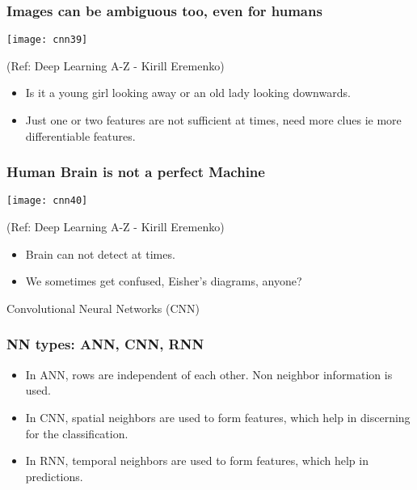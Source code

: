 \begin{frame}[fragile] \frametitle{Images can be ambiguous too, even for humans}

\begin{center}
\texttt{[image: cnn39]}

\tiny{(Ref: Deep Learning A-Z - Kirill Eremenko)}
\end{center}

\begin{itemize}
\item Is it a young girl looking away or an old lady looking downwards.
\item Just one or two features are not sufficient at times, need more clues ie more differentiable features.
\end{itemize}

\end{frame}

\begin{frame}[fragile] \frametitle{Human Brain is not a perfect Machine}

\begin{center}
\texttt{[image: cnn40]}

\tiny{(Ref: Deep Learning A-Z - Kirill Eremenko)}
\end{center}

\begin{itemize}
\item Brain can not detect at times.
\item We sometimes get confused, Eisher's diagrams, anyone?
\end{itemize}
\end{frame}



\begin{frame}
  \begin{center}
    {\Large Convolutional Neural Networks (CNN)}
  \end{center}
\end{frame}

\begin{frame}[fragile] \frametitle{NN types: ANN, CNN, RNN}

\begin{itemize}
\item In ANN, rows are independent of each other. Non neighbor information is used.
\item In CNN, spatial neighbors are used to form features, which help in discerning for the classification.
\item In RNN, temporal neighbors are used to form features, which help in predictions.
\end{itemize}


\end{frame}

